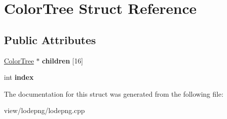 \hypertarget{struct_color_tree}{\section{Color\-Tree Struct Reference}
\label{struct_color_tree}
}
\subsection*{Public Attributes}
\begin{DoxyCompactItemize}
\item 
\hypertarget{struct_color_tree_a46a3b1d9239f5fd467ec97cd067b9a96}{\hyperlink{struct_color_tree}{Color\-Tree} $\ast$ {\bfseries children} \mbox{[}16\mbox{]}}\label{struct_color_tree_a46a3b1d9239f5fd467ec97cd067b9a96}

\item 
\hypertarget{struct_color_tree_ab3836a4a5981a7cf4ef553d25d9b0361}{int {\bfseries index}}\label{struct_color_tree_ab3836a4a5981a7cf4ef553d25d9b0361}

\end{DoxyCompactItemize}


The documentation for this struct was generated from the following file\-:\begin{DoxyCompactItemize}
\item 
view/lodepng/lodepng.\-cpp\end{DoxyCompactItemize}
